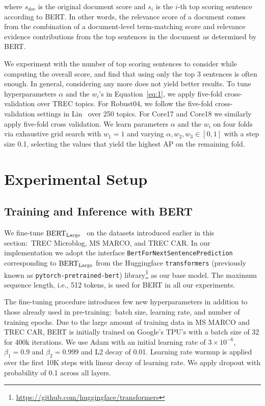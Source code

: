 \noindent where $ s_{doc} $ is the original document score and $ s_i $ is the $ i $-th top scoring sentence according to BERT.
In other words, the relevance score of a document comes from the combination of a document-level term-matching score and relevance evidence contributions from the top sentences in the document as determined by BERT.

We experiment with the number of top scoring sentences to consider while computing the overall score, and find that using only the top 3 sentences is often enough.
In general, considering any more does not yield better results.
To tune hyperparameters $ \alpha $ and the $ w_i $'s  in Equation~\ref{eq:1}, we apply five-fold cross-validation over TREC topics.
For Robust04, we follow the five-fold cross-validation settings in Lin~\cite{lin2019neural} over 250 topics.
For Core17 and Core18 we similarly apply five-fold cross validation.
We learn parameters $\alpha$ and the $w_i$ on four folds via exhaustive grid search with $ w_1 = 1 $ and varying $ \alpha, w_2, w_3 \in [0, 1] $ with a step size 0.1, selecting the values that yield the highest AP on the remaining fold.

\section{Experimental Setup}

\subsection{Training and Inference with BERT}

We fine-tune $ \textrm{BERT}_{\textrm{\scriptsize Large}} $~\cite{devlin2018bert} on the datasets introduced earlier in this section:\ TREC Microblog, MS MARCO, and TREC CAR.
In our implementation we adopt the interface \texttt{BertForNextSentencePrediction} corresponding to $ \textrm{BERT}_{\textrm{\scriptsize Large}} $ from the Huggingface \texttt{transformers} (previously known as \texttt{pytorch-pretrained-bert}) library\footnote{\url{https://github.com/huggingface/transformers}} as our base model.
The maximum sequence length, i.e., 512 tokens, is used for BERT in all our experiments.

The fine-tuning procedure introduces few new hyperparameters in addition to those already used in pre-training:\ batch size, learning rate, and number of training epochs.
Due to the large amount of training data in MS MARCO and TREC CAR, BERT is initially trained on Google's TPU's with a batch size of 32 for 400k iterations.
We use Adam \cite{kingma2014adam} with an initial learning rate of $ 3 \times 10^{-6}$, $ \beta_1 = 0.9 $ and $ \beta_2 = 0.999 $ and L2 decay of 0.01.
Learning rate warmup is applied over the first 10K steps with linear decay of learning rate.
We apply dropout with probability of 0.1 across all layers.

